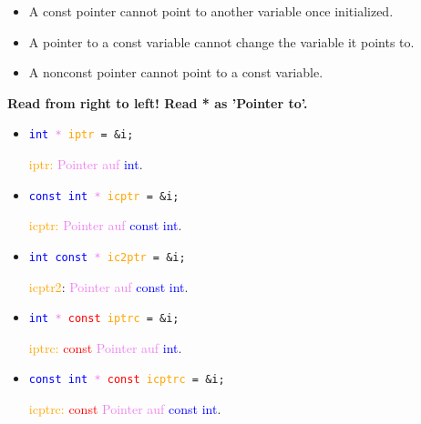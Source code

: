 \documentclass[10pt,a4paper]{scrartcl}
\begin{document}
\begin{multicols*}{2}
\begin{itemize}
\item A const pointer cannot point to another variable once initialized.
\item A pointer to a const variable cannot change the variable it points to.
\item A nonconst pointer cannot point to a const variable.
\end{itemize}

\textbf{Read from right to left! Read * as  'Pointer to'.}

\vspace{3ex}

\begin{minipage}[t]{0.4\linewidth}
\begin{itemize}
\item \texttt{\textcolor{blue}{int} \textcolor{violet}{*} \textcolor{orange}{iptr} = \&i;}

\textcolor{orange}{iptr:} \textcolor{violet}{Pointer auf} \textcolor{blue}{int}.
\item \texttt{\textcolor{blue}{const int}\textcolor{violet}{ *} \textcolor{orange}{icptr} = \&i;}

\textcolor{orange}{icptr:} \textcolor{violet}{Pointer auf} \textcolor{blue}{const int}.
\item \texttt{\textcolor{blue}{int const} \textcolor{violet}{*} \textcolor{orange}{ic2ptr} = \&i;}

\textcolor{orange}{icptr2}: \textcolor{violet}{Pointer auf} \textcolor{blue}{const int}.
\end{itemize}
\end{minipage}
\hfill
\begin{minipage}[t]{0.5\linewidth}
\begin{itemize}
\item \texttt{\textcolor{blue}{int} \textcolor{violet}{*} \textcolor{red}{const} \textcolor{orange}{iptrc} = \&i;}

\textcolor{orange}{iptrc:} \textcolor{red}{const} \textcolor{violet}{Pointer auf} \textcolor{blue}{int}.
\item \texttt{\textcolor{blue}{const int} \textcolor{violet}{*} \textcolor{red}{const} \textcolor{orange}{icptrc} = \&i;}

\textcolor{orange}{icptrc:} \textcolor{red}{const} \textcolor{violet}{Pointer auf} \textcolor{blue}{const int}.
\end{itemize}
\end{minipage}



\end{multicols*}
\end{document}
